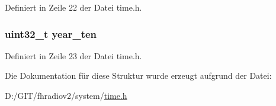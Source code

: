 Definiert in Zeile 22 der Datei time.\+h.

\hypertarget{structtime__date_a124f7250b4c2e15669a832132940840d}{}
\subsubsection[{year\+\_\+ten}]{\setlength{\rightskip}{0pt plus 5cm}uint32\+\_\+t year\+\_\+ten}\label{structtime__date_a124f7250b4c2e15669a832132940840d}


Definiert in Zeile 23 der Datei time.\+h.



Die Dokumentation für diese Struktur wurde erzeugt aufgrund der Datei\+:\begin{DoxyCompactItemize}
\item 
D\+:/\+G\+I\+T/fhradiov2/system/\hyperlink{time_8h}{time.\+h}\end{DoxyCompactItemize}
